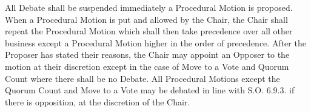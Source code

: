 \npara All Debate shall be suspended immediately a Procedural Motion is proposed.
\npara When a Procedural Motion is put and allowed by the Chair, the Chair shall repeat the Procedural Motion which shall then take precedence over all other business except a Procedural Motion higher in the order of precedence. After the Proposer has stated their reasons, the Chair may appoint an Opposer to the motion at their discretion except in the case of Move to a Vote and Quorum Count where there shall be no Debate. All Procedural Motions except the Quorum Count and Move to a Vote may be debated in line with S.O. 6.9.3. if there is opposition, at the discretion of the Chair.
% 
% 




